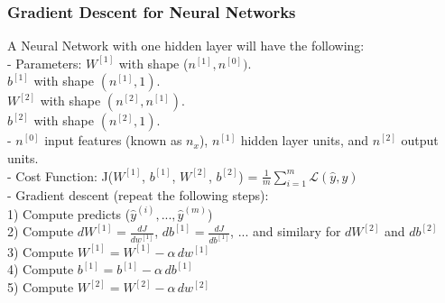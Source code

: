 \documentclass[11pt, a4paper]{article}
\begin{document}
\begin{spacing}{1.1}
	\subsubsection{Gradient Descent for Neural Networks}
	A Neural Network with one hidden layer will have the following: \vspace*{1mm} \\
	\hspace*{3mm} - Parameters: $W^{[1]}$ with shape ($n^{[1]},n^{[0]})$.\\ \hspace*{28mm} $b^{[1]}$ with shape $(n^{[1]},1)$.\\ \hspace*{28mm} $W^{[2]}$ with shape $(n^{[2]},n^{[1]})$.\\ \hspace*{28mm} $b^{[2]}$ with shape $(n^{[2]},1)$. \vspace*{1mm} \\
	\hspace*{3mm} - $n^{[0]}$ input features (known as $n_x$), $n^{[1]}$ hidden layer units, and $n^{[2]}$ output units. \vspace*{1mm} \\
	\hspace*{3mm} - Cost Function: J($W^{[1]}$, $b^{[1]}$, $W^{[2]}$, $b^{[2]}$) = $\frac{1}{m} \sum_{i=1}^{m}\mathcal{L}(\hat{y},y)$ \vspace*{1mm} \\
	\hspace*{3mm} - Gradient descent (repeat the following steps): \vspace*{.5mm} \\
	\hspace*{8mm} 1) Compute predicts ($\hat{y}^{(i)}, ..., \hat{y}^{(m)}$) \\
	\hspace*{8mm} 2) Compute $dW^{[1]} = \frac{dJ}{dw^{[1]}}$, $db^{[1]} = \frac{dJ}{db^{[1]}}$, ... and similary for $dW^{[2]}$ and $db^{[2]}$ \vspace*{.5mm} \\
	\hspace*{8mm} 3) Compute $W^{[1]} = W^{[1]} - \alpha\, dw^{[1]}$ \vspace*{.5mm} \\
	\hspace*{8mm} 4) Compute $b^{[1]} = b^{[1]} - \alpha\, db^{[1]}$ \vspace*{.5mm} \\
	\hspace*{8mm} 5) Compute $W^{[2]} = W^{[2]} - \alpha\, dw^{[2]}$ \vspace*{.5mm} \\

\end{spacing}
\end{document}

